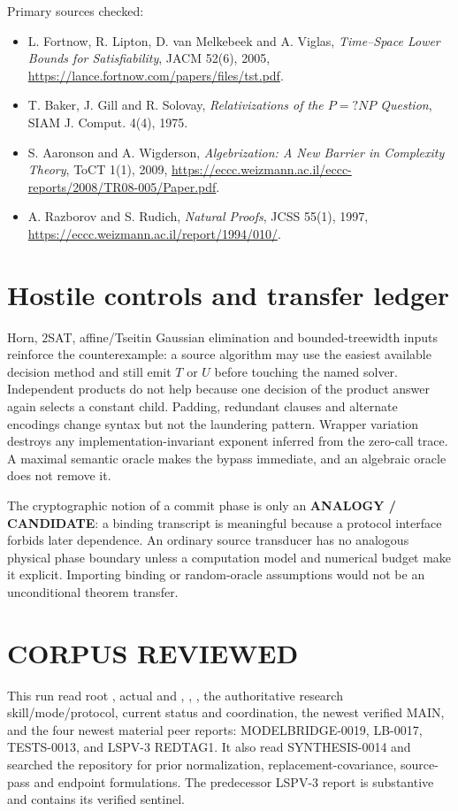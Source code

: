 \documentclass[11pt]{article}
\begin{document}
Primary sources checked:
\begin{itemize}[leftmargin=1.5em]
\item L. Fortnow, R. Lipton, D. van Melkebeek and A. Viglas,
  \emph{Time--Space Lower Bounds for Satisfiability}, JACM 52(6), 2005,
  \url{https://lance.fortnow.com/papers/files/tst.pdf}.
\item T. Baker, J. Gill and R. Solovay, \emph{Relativizations of the
  $P=?NP$ Question}, SIAM J. Comput. 4(4), 1975.
\item S. Aaronson and A. Wigderson, \emph{Algebrization: A New Barrier in
  Complexity Theory}, ToCT 1(1), 2009,
  \url{https://eccc.weizmann.ac.il/eccc-reports/2008/TR08-005/Paper.pdf}.
\item A. Razborov and S. Rudich, \emph{Natural Proofs}, JCSS 55(1), 1997,
  \url{https://eccc.weizmann.ac.il/report/1994/010/}.
\end{itemize}

\section{Hostile controls and transfer ledger}

Horn, $2$SAT, affine/Tseitin Gaussian elimination and bounded-treewidth
inputs reinforce the counterexample: a source algorithm may use the easiest
available decision method and still emit $T$ or $U$ before touching the named
solver.  Independent products do not help because one decision of the product
answer again selects a constant child.  Padding, redundant clauses and
alternate encodings change syntax but not the laundering pattern.  Wrapper
variation destroys any implementation-invariant exponent inferred from the
zero-call trace.  A maximal semantic oracle makes the bypass immediate, and
an algebraic oracle does not remove it.

The cryptographic notion of a commit phase is only an \textbf{ANALOGY /
CANDIDATE}: a binding transcript is meaningful because a protocol interface
forbids later dependence.  An ordinary source transducer has no analogous
physical phase boundary unless a computation model and numerical budget make
it explicit.  Importing binding or random-oracle assumptions would not be an
unconditional theorem transfer.

\section{CORPUS REVIEWED}

This run read root , actual  and
, , , the authoritative
research skill/mode/protocol, current status and coordination, the newest
verified MAIN, and the four newest material peer reports:
MODELBRIDGE-0019, LB-0017, TESTS-0013, and LSPV-3 REDTAG1.  It also read
SYNTHESIS-0014 and searched the repository for prior normalization,
replacement-covariance, source-pass and endpoint formulations.  The
predecessor LSPV-3 report is substantive and contains its verified sentinel.
\end{document}
